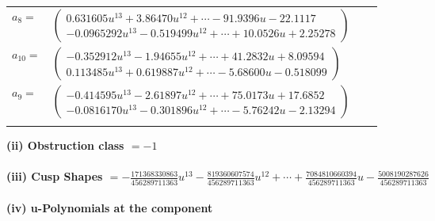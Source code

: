 \documentclass[1p]{elsarticle_modified}
\theoremstyle{definition}
\begin{document}
\begin{tabular}{m{7pt} m{180pt} m{7pt} m{180pt} }
\flushright $a_{8}=$&$\begin{pmatrix}0.631605 u^{13}+3.86470 u^{12}+\cdots-91.9396 u-22.1117\\-0.0965292 u^{13}-0.519499 u^{12}+\cdots+10.0526 u+2.25278\end{pmatrix}$ \\
\flushright $a_{10}=$&$\begin{pmatrix}-0.352912 u^{13}-1.94655 u^{12}+\cdots+41.2832 u+8.09594\\0.113485 u^{13}+0.619887 u^{12}+\cdots-5.68600 u-0.518099\end{pmatrix}$ \\
\flushright $a_{9}=$&$\begin{pmatrix}-0.414595 u^{13}-2.61897 u^{12}+\cdots+75.0173 u+17.6852\\-0.0816170 u^{13}-0.301896 u^{12}+\cdots-5.76242 u-2.13294\end{pmatrix}$\\&\end{tabular}
\flushleft \textbf{(ii) Obstruction class $= -1$}\\~\\
\flushleft \textbf{(iii) Cusp Shapes $= -\frac{171368330863}{456289711363} u^{13}-\frac{819360607574}{456289711363} u^{12}+\cdots+\frac{7084810660394}{456289711363} u-\frac{5008190287626}{456289711363}$}\\~\\
\newpage\renewcommand{\arraystretch}{1}
\flushleft \textbf{(iv) u-Polynomials at the component}\newline \\
\end{document}
